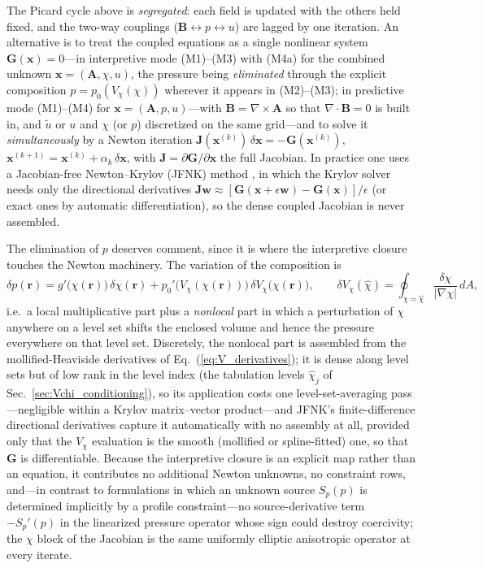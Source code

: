\documentclass[english]{article}
\newcommand{\bB}{\mathbf{B}}
\newcommand{\br}{\mathbf{r}}
\begin{document}
The Picard cycle above is \emph{segregated}: each field is updated with the others held fixed, and
the two-way couplings ($\bB\!\leftrightarrow\!p\!\leftrightarrow\!u$) are lagged by one iteration.
An alternative is to treat the coupled equations as a single nonlinear system
$\mathbf{G}(\mathbf{x})=0$---in interpretive mode (M1)--(M3) with (M4a) for the combined unknown
$\mathbf{x}=(\mathbf{A},\chi,u)$, the pressure being \emph{eliminated} through the explicit
composition $p=p_0(V_\chi(\chi))$ wherever it appears in (M2)--(M3); in predictive mode
(M1)--(M4) for $\mathbf{x}=(\mathbf{A},p,u)$---with $\bB=\nabla\times\mathbf{A}$ so that
$\nabla\cdot\bB=0$ is built in, and $\tilde u$ or $u$ and $\chi$ (or $p$) discretized on the same
grid---and to solve it \emph{simultaneously} by a Newton iteration
$\mathbf{J}(\mathbf{x}^{(k)})\,\delta\mathbf{x}=-\mathbf{G}(\mathbf{x}^{(k)})$,
$\mathbf{x}^{(k+1)}=\mathbf{x}^{(k)}+\alpha_k\,\delta\mathbf{x}$, with
$\mathbf{J}=\partial\mathbf{G}/\partial\mathbf{x}$ the full Jacobian. In practice one uses a
Jacobian-free Newton--Krylov (JFNK) method \cite{knoll2004}, in which the Krylov solver needs only
the directional derivatives $\mathbf{J}\mathbf{w}\approx[\mathbf{G}(\mathbf{x}+\epsilon\mathbf{w})
-\mathbf{G}(\mathbf{x})]/\epsilon$ (or exact ones by automatic differentiation), so the dense
coupled Jacobian is never assembled.

The elimination of $p$ deserves comment, since it is where the interpretive closure touches the
Newton machinery. The variation of the composition is
\begin{equation}
\delta p(\br)=g'\big(\chi(\br)\big)\,\delta\chi(\br)
+p_0'\big(V_\chi(\chi(\br))\big)\,\delta V_\chi\big(\chi(\br)\big),
\qquad
\delta V_\chi(\hat\chi)=\oint_{\chi=\hat\chi}\frac{\delta\chi}{|\nabla\chi|}\,dA ,
\label{eq:composition_linearization}
\end{equation}
i.e.\ a local multiplicative part plus a \emph{nonlocal} part in which a perturbation of $\chi$
anywhere on a level set shifts the enclosed volume and hence the pressure everywhere on that level
set. Discretely, the nonlocal part is assembled from the mollified-Heaviside derivatives of
Eq.~(\ref{eq:V_derivatives}); it is dense along level sets but of low rank in the level index (the
tabulation levels $\hat\chi_j$ of Sec.~\ref{sec:Vchi_conditioning}), so its application costs one
level-set-averaging pass---negligible within a Krylov matrix--vector product---and JFNK's
finite-difference directional derivatives capture it automatically with no assembly at all,
provided only that the $V_\chi$ evaluation is the smooth (mollified or spline-fitted) one, so that
$\mathbf{G}$ is differentiable. Because the interpretive closure is an explicit map rather than an
equation, it contributes no additional Newton unknowns, no constraint rows, and---in contrast to
formulations in which an unknown source $S_p(p)$ is determined implicitly by a profile
constraint---no source-derivative term $-S_p'(p)$ in the linearized pressure operator whose sign
could destroy coercivity; the $\chi$ block of the Jacobian is the same uniformly elliptic
anisotropic operator at every iterate.
\end{document}
